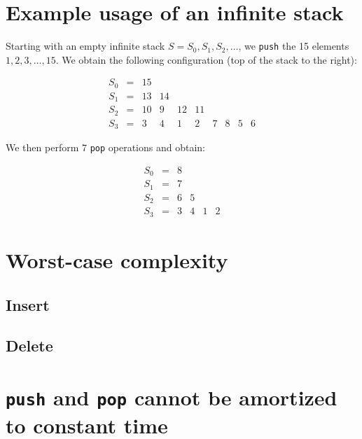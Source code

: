 \section{Example usage of an infinite stack}
Starting with an empty infinite stack $S = S_0, S_1, S_2, \ldots$, we \texttt{push} the 15 elements $1, 2, 3,\ldots, 15$. We obtain the following configuration (top of the stack to the right):

\[
\begin{array}{lcccccccccc}
  S_0 & = & 15\\
  S_1 & = & 13 & 14\\
  S_2 & = & 10 & 9 & 12 & 11\\
  S_3 & = & 3 & 4 & 1 & 2 & 7 & 8 & 5 & 6
\end{array}
\]

We then perform 7 \texttt{pop} operations and obtain:

\[
\begin{array}{lcccccccccc}
  S_0 & = & 8\\
  S_1 & = & 7\\
  S_2 & = & 6 & 5 &\\
  S_3 & = & 3 & 4 & 1 & 2
\end{array}
\]

\section{Worst-case complexity}
  \subsection{Insert}
  \subsection{Delete}

\section{\texttt{push} and \texttt{pop} cannot be amortized to constant time}
